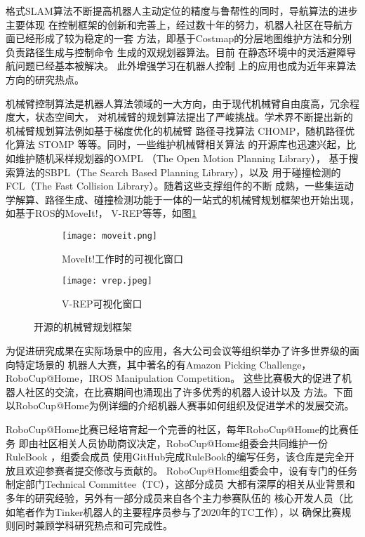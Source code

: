 格式SLAM算法不断提高机器人主动定位的精度与鲁帮性的同时，导航算法的进步主要体现
在控制框架的创新和完善上，经过数十年的努力，机器人社区在导航方面已经形成了较为稳定的一套
方法，即基于Costmap的分层地图维护方法\cite{lu2014layered}和分别负责路径生成与控制命令
生成的双规划器算法\cite{guimaraes2016ros}。目前
在静态环境中的灵活避障导航问题已经基本被解决\cite{Zhou2017A}。 此外增强学习在机器人控制
上的应用也成为近年来算法方向的研究热点\cite{schaal2002learning}。

机械臂控制算法是机器人算法领域的一大方向，由于现代机械臂自由度高，冗余程度大，状态空间大，
对机械臂的规划算法提出了严峻挑战。学术界不断提出新的机械臂规划算法例如基于梯度优化的机械臂
路径寻找算法 CHOMP\cite{ratliff2009chomp}，随机路径优化算法 STOMP\cite{kalakrishnan2011stomp}
等等。同时，一些维护机械臂相关算法 的开源库也迅速兴起，比如维护随机采样规划器的OMPL
（The Open Motion Planning Library）\cite{sucan2010open}，
基于搜索算法的SBPL（The Search Based Planning Library）\cite{likhachev2014sbpl}，以及
用于碰撞检测的FCL（The Fast Collision Library）\cite{pan2012fcl}。随着这些支撑组件的不断
成熟，一些集运动学解算、路径生成、碰撞检测功能于一体的一站式的机械臂规划框架也开始出现，
如基于ROS的MoveIt!\cite{chitta2012moveit}， V-REP等等，如图\ref{fig:moveit_vrep}

\begin{figure}
\centering
\begin{subfigure}{.5\textwidth}
  \centering
  \texttt{[image: moveit.png]}
  \caption{MoveIt!工作时的可视化窗口}
\end{subfigure}%
\begin{subfigure}{.5\textwidth}
  \centering
  \texttt{[image: vrep.jpeg]}
  \caption{V-REP可视化窗口}
\end{subfigure}
\caption{开源的机械臂规划框架}
\label{fig:moveit_vrep}
\end{figure}


为促进研究成果在实际场景中的应用，各大公司会议等组织举办了许多世界级的面向特定场景的
机器人大赛，其中著名的有Amazon Picking Challenge\cite{wurman2016amazon}，
RoboCup@Home\cite{wisspeintner2009robocup}，IROS Manipulation Competition\cite{moon2017iros}。
这些比赛极大的促进了机器人社区的交流，在比赛期间也涌现出了许多优秀的机器人设计以及
方法。下面以RoboCup@Home为例详细的介绍机器人赛事如何组织及促进学术的发展交流。

RoboCup@Home比赛已经培育起一个完善的社区，每年RoboCup@Home的比赛任务
即由社区相关人员协助商议决定，RoboCup@Home组委会共同维护一份RuleBook\cite{rulebook}
，组委会成员
使用GitHub完成RuleBook的编写任务，该仓库是完全开放且欢迎参赛者提交修改与贡献的。
RoboCup@Home组委会中，设有专门的任务制定部门Technical Committee（TC），这部分成员
大都有深厚的相关从业背景和多年的研究经验，另外有一部分成员来自各个主力参赛队伍的
核心开发人员（比如笔者作为Tinker机器人的主要程序员参与了2020年的TC工作），以
确保比赛规则同时兼顾学科研究热点和可完成性。

